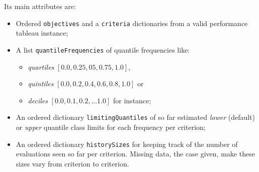 Its main attributes are:
\begin{itemize}[rightmargin=0.5cm,leftmargin=0.5cm,topsep=1pt]
\item Ordered \texttt{objectives} and a \texttt{criteria} dictionaries from a valid performance tableau instance;
\item A list \texttt{quantileFrequencies} of quantile frequencies like:
  \begin{itemize}[nosep]
  \item \emph{quartiles} $[0.0, 0.25, 05, 0.75,1.0]$,
  \item  \emph{quintiles} $[0.0, 0.2, 0.4, 0.6, 0.8, 1.0]$ or
  \item  \emph{deciles} $[0.0, 0.1, 0.2, ... 1.0]$ for instance;
  \end{itemize}
\item An ordered  dictionary \texttt{limitingQuantiles} of so far estimated \emph{lower} (default) or \emph{upper} quantile class limits for each frequency per criterion;
\item An ordered dictionary \texttt{historySizes} for keeping track of the number of evaluations seen so far per criterion. Missing data, the case given, make these sizes vary from criterion to criterion.
\end{itemize}

